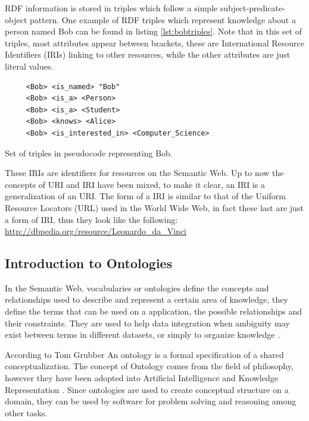 RDF information is stored in triples which follow a simple subject-predicate-object pattern. One example of RDF triples which represent knowledge about a person named Bob can be found in listing \ref{lst:bobtriples}. Note that in this set of triples, most attributes appear between brackets, these are International Resource Identifiers (IRIs) linking to other resources, while the other attributes are just literal values. 

\begin{listing}\centering
  \begin{minipage}{.4\textwidth}
    \begin{verbatim}
     <Bob> <is_named> "Bob"
     <Bob> <is_a> <Person>
     <Bob> <is_a> <Student>
     <Bob> <knows> <Alice>
     <Bob> <is_interested_in> <Computer_Science>
    \end{verbatim}
  \end{minipage}
  \caption{Set of triples in pseudocode representing Bob.}\label{lst:bobtriples}
\end{listing}

These IRIs are identifiers for resources on the Semantic Web. Up to now the concepts of URI and IRI have been mixed, to make it clear, an IRI is a generalization of an URI. The form of a IRI is similar to that of the Uniform Resource Locators (URL) used in the World Wide Web, in fact these last are just a form of IRI, thus they look like the following:  \url{http://dbpedia.org/resource/Leonardo_da_Vinci}
 

\subsection{Introduction to Ontologies}

In the Semantic Web, vocabularies or ontologies define the concepts and relationships used to describe and represent a certain area of knowledge, they define the terms that can be used on a application, the possible relationships and their constraints. They are used to help data integration when ambiguity may exist between terms in different datasets, or simply to organize knowledge \cite{w3contologies}.

According to Tom Grubber \cite{gruber1993ontology} An ontology is a formal specification of a shared conceptualization. The concept of Ontology comes from the field of philosophy, however they have been adopted into Artificial Intelligence and Knowledge Representation \cite{chandrasekaran1999ontologies}. Since ontologies are used to create conceptual structure on a domain, they can be used by software for problem solving and reasoning among other tasks.

